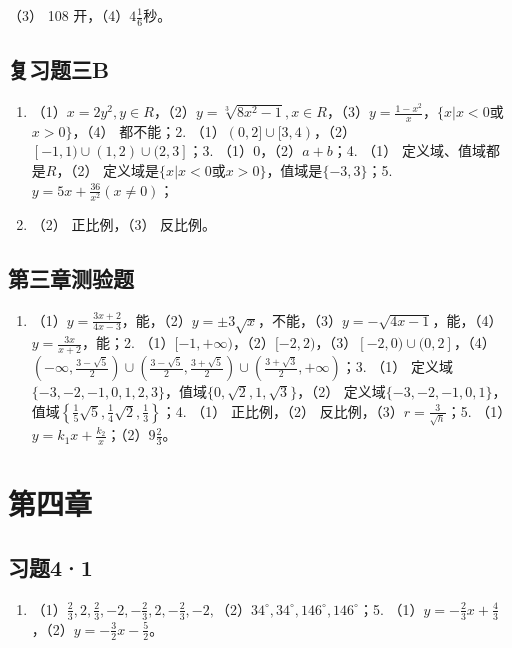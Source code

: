 （3） 108 开，（4）\(4\frac{1}{6}\)秒。

\subsection{复习题三B}

\begin{enumerate}
\item
  （1）\(x = 2y^2, y \in R\)，（2）\(y = \sqrt[3]{8x^2 - 1}, x \in R\)，（3）\(y = \frac{1 - x^2}{x}\)，\(\{x | x < 0\)或\(x > 0\}\)，（4）
  都不能；2.
  （1）\((0, 2] \cup [3, 4)\)，（2）\([-1, 1) \cup (1, 2) \cup (2, 3]\)；3.
  （1）\(0\)，（2）\(a + b\)；4. （1） 定义域、值域都是\(R\)，（2）
  定义域是\(\{x | x < 0\)或\(x > 0\}\)，值域是\(\{-3, 3\}\)；5.\(y = 5x + \frac{36}{x^2} (x \neq 0)\)；
\item
  （2） 正比例，（3） 反比例。
\end{enumerate}

\subsection{第三章测验题}

\begin{enumerate}
\item
  （1）\(y = \frac{3x + 2}{4x - 3}\)，能，（2）\(y = \pm 3\sqrt{x}\)，不能，（3）\(y = -\sqrt{4x - 1}\)，能，（4）\(y = \frac{3x}{x + 2}\)，能；2.
  （1）\([-1, +\infty)\)，（2）\([-2, 2)\)，（3）\([-2, 0) \cup (0, 2]\)，（4）\((-\infty, \frac{3 - \sqrt{5}}{2}) \cup (\frac{3 - \sqrt{5}}{2}, \frac{3 + \sqrt{5}}{2}) \cup (\frac{3 + \sqrt{3}}{2}, +\infty)\)；3.
  （1）
  定义域\(\{-3, -2, -1, 0, 1, 2, 3\}\)，值域\(\{0, \sqrt{2}, 1, \sqrt{3}\}\)，（2）
  定义域\(\{-3, -2, -1, 0, 1\}\)，值域\(\left\{\frac{1}{5}\sqrt{5}, \frac{1}{4}\sqrt{2}, \frac{1}{3}\right\}\)；4.
  （1） 正比例，（2） 反比例，（3）\(r = \frac{3}{\sqrt{h}}\)；5.
  （1）\(y = k_1x + \frac{k_2}{x}\)；（2）\(9\frac{2}{3}\)。
\end{enumerate}

\section{第四章}

\subsection{习题4·1}

\begin{enumerate}[start=3]
\item
  （1）\(\frac{2}{3}, 2, \frac{2}{3}, -2, -\frac{2}{3}, 2, -\frac{2}{3}, -2,\)（2）\(34^{\circ}, 34^{\circ}, 146^{\circ},\)\(146^{\circ}\)；5.
  （1）\(y = -\frac{2}{3} x + \frac{4}{3}\)，（2）\(y = -\frac{3}{2} x - \frac{5}{2}\)。
\end{enumerate}

